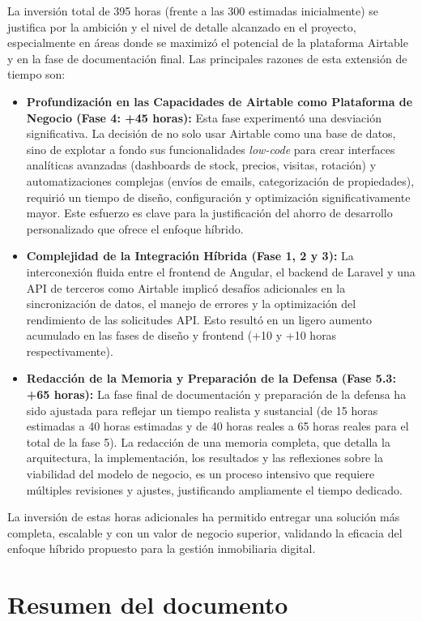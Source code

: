 La inversión total de 395 horas (frente a las 300 estimadas inicialmente) se justifica por la ambición y el nivel de detalle alcanzado en el proyecto, especialmente en áreas donde se maximizó el potencial de la plataforma Airtable y en la fase de documentación final. Las principales razones de esta extensión de tiempo son:
\begin{itemize}
    \item \textbf{Profundización en las Capacidades de Airtable como Plataforma de Negocio (Fase 4: +45 horas):} Esta fase experimentó una desviación significativa. La decisión de no solo usar Airtable como una base de datos, sino de explotar a fondo sus funcionalidades \textit{low-code} para crear interfaces analíticas avanzadas (dashboards de stock, precios, visitas, rotación) y automatizaciones complejas (envíos de emails, categorización de propiedades), requirió un tiempo de diseño, configuración y optimización significativamente mayor. Este esfuerzo es clave para la justificación del ahorro de desarrollo personalizado que ofrece el enfoque híbrido.
    \item \textbf{Complejidad de la Integración Híbrida (Fase 1, 2 y 3):} La interconexión fluida entre el frontend de Angular, el backend de Laravel y una API de terceros como Airtable implicó desafíos adicionales en la sincronización de datos, el manejo de errores y la optimización del rendimiento de las solicitudes API. Esto resultó en un ligero aumento acumulado en las fases de diseño y frontend (+10 y +10 horas respectivamente).
    \item \textbf{Redacción de la Memoria y Preparación de la Defensa (Fase 5.3: +65 horas):} La fase final de documentación y preparación de la defensa ha sido ajustada para reflejar un tiempo realista y sustancial (de 15 horas estimadas a 40 horas estimadas y de 40 horas reales a 65 horas reales para el total de la fase 5). La redacción de una memoria completa, que detalla la arquitectura, la implementación, los resultados y las reflexiones sobre la viabilidad del modelo de negocio, es un proceso intensivo que requiere múltiples revisiones y ajustes, justificando ampliamente el tiempo dedicado.
\end{itemize}
La inversión de estas horas adicionales ha permitido entregar una solución más completa, escalable y con un valor de negocio superior, validando la eficacia del enfoque híbrido propuesto para la gestión inmobiliaria digital.


\section{Resumen del documento}


